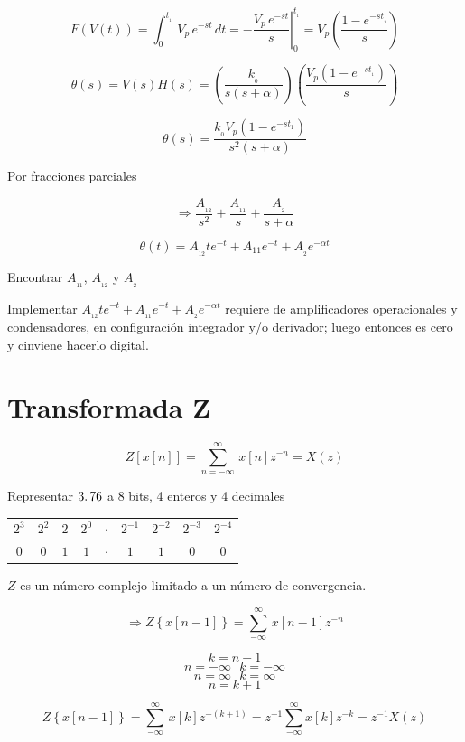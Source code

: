 
$$F(V(t)) = \displaystyle \int_{0}^{t_{_{1}}}\, V_{p}\,e^{-st}\, dt = \left. - \dfrac{V_{p}\,e^{-st}}{s} \right|_{0}^{t_{_{1}}} = V_{p} \left( \dfrac{1 - e^{-st_{_{1}}}}{s} \right) $$

$$\theta(s) = V(s)H(s) = \left( \dfrac{k_{_{0}}}{s(s + \alpha)} \right) \left( \dfrac{V_{p}(1 - e^{-st_{_{1}}})}{s} \right)  $$

$$\theta(s) = \dfrac{k_{_{0}}V_{p}(1 - e^{-st_{1}})}{s^2(s + \alpha)}$$

Por fracciones parciales

$$\Rightarrow \dfrac{A_{_{12}}}{s^2} + \dfrac{A_{_{11}}}{s} + \dfrac{A_{_{2}}}{s + \alpha}$$

$$\theta(t) = A_{_{12}} te^{-t} + A_{11}e^{-t} + A_{_{2}}e^{-\alpha t}$$

Encontrar $A_{_{11}}$, $A_{_{12}}$ y $A_{_{2}}$


Implementar $A_{_12}te^{-t} + A_{_{11}}e^{-t} + A_{_{2}}e^{-\alpha t}$ requiere de amplificadores operacionales y condensadores, en configuración integrador y/o derivador; luego entonces es cero y cinviene hacerlo digital.


\section{Transformada Z}

$$Z\left[ x[n] \right] = \displaystyle \sum_{n = -\infty}^{\infty}\, x[n]z^{-n} = X(z)$$

Representar $3\ldotp76$ a 8 bits, 4 enteros y 4 decimales

\begin{table}
	\begin{tabular}{ccccccccc}
		$2^3$ & $2^2$ & $2$ & $2^0$ & $\cdotp$ & $2^{-1}$ & $2^{-2}$ & $2^{-3}$ & $2^{-4}$    \\
		$0$ & $0$ & $1$ & $1$ & $\cdotp$ & $1$ & $1$ & $0$ & $0$
	\end{tabular}
\end{table}

$Z$ es un número complejo limitado a un número de convergencia.

$$\Rightarrow Z\left\lbrace x[n - 1] \right\rbrace = \displaystyle \sum_{-\infty}^{\infty}\, x[n - 1]z^{-n}$$

$$k = n - 1$$
$$n = -\infty \:\:\: k = -\infty$$
$$n = \infty \:\:\: k = \infty$$
$$n = k + 1$$

$$Z\left\lbrace x[n - 1] \right\rbrace = \displaystyle \sum_{- \infty}^{\infty} \, x[k]z^{-(k + 1)} = z^{-1} \displaystyle \sum_{-\infty}^{\infty} x[k]z^{-k} = z^{-1} X(z)$$

